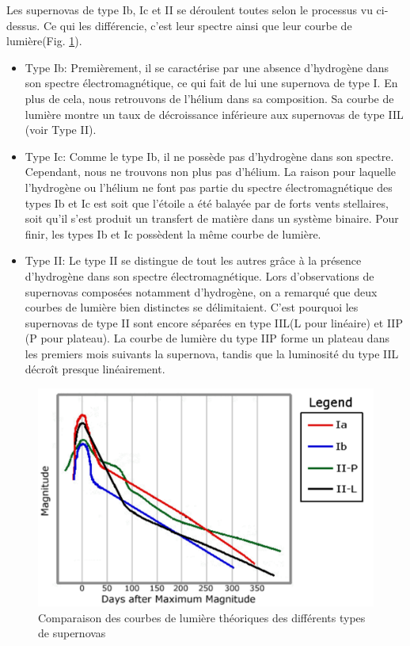 Les supernovas de type Ib, Ic et II se déroulent toutes selon le processus vu ci-dessus. Ce qui les différencie, c'est leur spectre ainsi que leur courbe de lumière\footnotemark[1] (Fig. \ref{Fig. 3.1}).\bigskip

\begin{itemize}
	
	\item Type Ib: Premièrement, il se caractérise par une absence d'hydrogène dans son spectre électromagnétique, ce qui fait de lui une supernova de type I. En plus de cela, nous retrouvons de l'hélium dans sa composition. Sa courbe de lumière montre un taux de décroissance inférieure aux supernovas de type IIL (voir Type II).
	
	\item Type Ic: Comme le type Ib, il ne possède pas d'hydrogène dans son spectre. Cependant, nous ne trouvons non plus pas d'hélium. La raison pour laquelle l'hydrogène ou l'hélium ne font pas partie du spectre électromagnétique des types Ib et Ic est soit que l'étoile a été balayée par de forts vents stellaires, soit qu'il s'est produit un transfert de matière dans un système binaire. Pour finir, les types Ib et Ic possèdent la même courbe de lumière.
	
	\item Type II: Le type II se distingue de tout les autres grâce à la présence d'hydrogène dans son spectre électromagnétique. Lors d'observations de supernovas composées notamment d'hydrogène, on a remarqué que deux courbes de lumière bien distinctes se délimitaient. C'est pourquoi les supernovas de type II sont encore séparées en type IIL(L pour linéaire) et IIP (P pour plateau). La courbe de lumière du type IIP forme un plateau dans les premiers mois suivants la supernova, tandis que la luminosité du type IIL décroît presque linéairement.
	
\end{itemize}

\begin{figure}[H]
	\centering
	\includegraphics[scale=0.33]{images/lightcurves}
	\caption[Comparaison des courbes de lumière théoriques des différents types de supernovas]{Comparaison des courbes de lumière théoriques des différents types de supernovas }
	\label{Fig. 3.1}
\end{figure}

